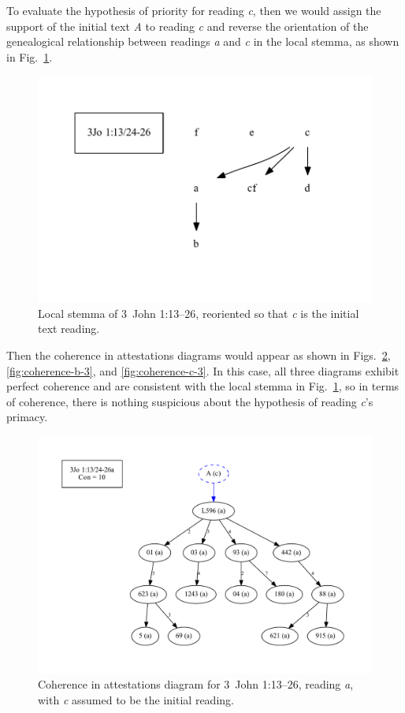 \documentclass[a4paper, 12pt]{article}
\begin{document}
	To evaluate the hypothesis of priority for reading \emph{c}, then we would assign the support of the initial text \emph{A} to reading \emph{c} and reverse the orientation of the genealogical relationship between readings \emph{a} and \emph{c} in the local stemma, as shown in Fig.~\ref{fig:local-stemma-c-initial}.
	
	\begin{figure}[h!]
		\centering
		\includegraphics[scale=0.6666]{../graphics/B25K1V13U24-26-local-stemma-c-initial.pdf}
		\caption{Local stemma of 3~John 1:13–26, reoriented so that \emph{c} is the initial text reading.}
		\label{fig:local-stemma-c-initial}
	\end{figure}
	\noindent
	Then the coherence in attestations diagrams would appear as shown in Figs.~\ref{fig:coherence-a-3}, \ref{fig:coherence-b-3}, and \ref{fig:coherence-c-3}. In this case, all three diagrams exhibit perfect coherence and are consistent with the local stemma in Fig.~\ref{fig:local-stemma-c-initial}, so in terms of coherence, there is nothing suspicious about the hypothesis of reading \emph{c}'s primacy.
	
	\begin{figure}
		\centering
		\includegraphics[scale=0.3333]{../graphics/B25K1V13U24-26Ra-coherence-attestations-3.pdf}
		\caption{Coherence in attestations diagram for 3~John 1:13–26, reading \emph{a}, with \emph{c} assumed to be the initial reading.}
		\label{fig:coherence-a-3}
	\end{figure}
	
\end{document}
